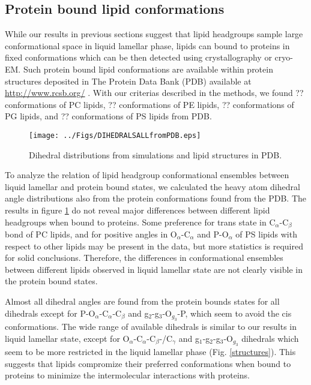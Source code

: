 \documentclass[aps,prl,superscriptaddress,twocolumn]{revtex4}
\begin{document}
\subsection{Protein bound lipid conformations}

While our results in previous sections suggest that lipid headgroups
sample large conformational space in liquid lamellar phase, lipids
can bound to proteins in fixed conformations which can be then detected
using crystallography or cryo-EM. Such protein bound lipid conformations are
available within protein structures deposited in The Protein Data Bank (PDB)
available at \url{http://www.rcsb.org/} \cite{berman00}. With our criterias described
in the methods, we found
?? conformations of PC lipids,
?? conformations of PE lipids,
?? conformations of PG lipids, and
?? conformations of PS lipids from PDB.

\begin{figure}[]
  \centering
  \texttt{[image: ../Figs/DIHEDRALSALLfromPDB.eps]}
  \caption{\label{dihedralsFROMpdb}
    Dihedral distributions from simulations and lipid structures in PDB.
  }
\end{figure}

To analyze the relation of lipid headgroup conformational ensembles between
liquid lamellar and protein bound states, we calculated the heavy atom dihedral angle
distributions also from the protein conformations found from the PDB.
The results in figure \ref{dihedralsFROMpdb} do not reveal major differences
between different lipid headgroups when bound to proteins.
Some preference for trans state in C$_\alpha$-C$_\beta$ bond of PC lipids, and
for positive angles in O$_\alpha$-C$_\alpha$ and P-O$_\alpha$ of PS lipids with respect
to other lipids may be present in the data, but more statistics is required for solid
conclusions. Therefore, the differences in conformational ensembles between different
lipids observed in liquid lamellar state are not clearly visible in the protein bound states.

Almost all dihedral angles are found from the protein bounds states for all dihedrals
except for P-O$_\alpha$-C$_\alpha$-C$_\beta$ and g$_2$-g$_3$-O$_{g_3}$-P, which seem to avoid
the cis conformations. The wide range of available dihedrals is similar to our results
in liquid lamellar state, except for O$_\alpha$-C$_\alpha$-C$_\beta$-/C$_\gamma$ and
g$_1$-g$_2$-g$_3$-O$_{g_3}$ dihedrals which seem to be more restricted in the liquid
lamellar phase (Fig. \ref{structures}). This suggests that lipids compromize their
preferred conformations when bound to proteins to minimize the intermolecular interactions
with proteins.
\end{document}
